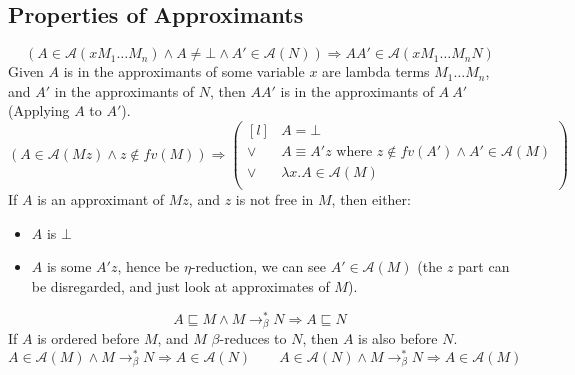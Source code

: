 \subsection{Properties of Approximants}
\[(A \in \mathcal{A}(xM_1\dots M_n) \land A \neq \bot \land A' \in \mathcal{A}(N) ) \Rightarrow A A' \in \mathcal{A}(x M_1 \dots M_n N)\]
Given $A$ is in the approximants of some variable $x$ are lambda terms $M_1 \dots M_n$, and $A'$ in the approximants of $N$, then $A A'$ is in the approximants of $A \ A'$ (Applying $A$ to $A'$).
\vspace{5mm}
\[(A \in \mathcal{A}(Mz) \land z \not\in fv(M) ) \Rightarrow \left( \begin{matrix*}[l]
    & A = \bot \\
    \lor & A \equiv A'z \text{ where } z \not\in fv(A') \land A' \in \mathcal{A}(M) \\
    \lor & \lambda x. A \in \mathcal{A}(M) \\
\end{matrix*} \right)\]
If $A$ is an approximant of $Mz$, and $z$ is not free in $M$, then either:
\begin{itemize}
    \item $A$ is $\bot$
    \item $A$ is some $A'z$, hence be $\eta$-reduction, we can see $A' \in \mathcal{A}(M)$ (the $z$ part can be disregarded, and just look at approximates of $M$).
\end{itemize}
\vspace{5mm}
\[A \sqsubseteq M \land M \to^*_\beta N \Rightarrow A \sqsubseteq N\]
If $A$ is ordered before $M$, and $M$ $\beta$-reduces to $N$, then $A$ is also before $N$.
\vspace{5mm}
\[A \in \mathcal{A}(M) \land M \to^*_\beta N \Rightarrow A \in \mathcal{A}(N) \qquad A \in \mathcal{A}(N) \land M \to^*_\beta N \Rightarrow A \in \mathcal{A}(M)\]

\unfinished

